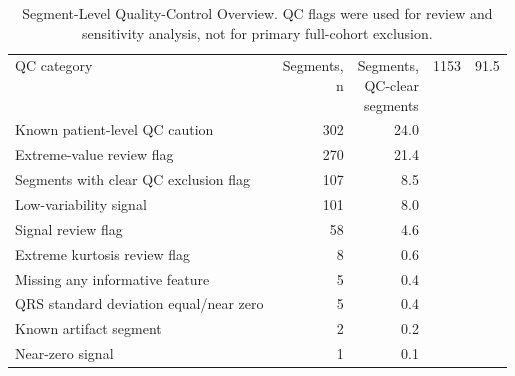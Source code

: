 \begin{table}
\caption{Segment-Level Quality-Control Overview. QC flags were used for review and sensitivity analysis, not for primary full-cohort exclusion.}
\label{tab:segment_qc_overview}
\begin{tabular}{p{0.58\linewidth}rr}
\toprule
QC category & Segments, n & Segments, %
\midrule
QC-clear segments & 1153 & 91.5 \\
Known patient-level QC caution & 302 & 24.0 \\
Extreme-value review flag & 270 & 21.4 \\
Segments with clear QC exclusion flag & 107 & 8.5 \\
Low-variability signal & 101 & 8.0 \\
Signal review flag & 58 & 4.6 \\
Extreme kurtosis review flag & 8 & 0.6 \\
Missing any informative feature & 5 & 0.4 \\
QRS standard deviation equal/near zero & 5 & 0.4 \\
Known artifact segment & 2 & 0.2 \\
Near-zero signal & 1 & 0.1 \\
\bottomrule
\end{tabular}
\end{table}
